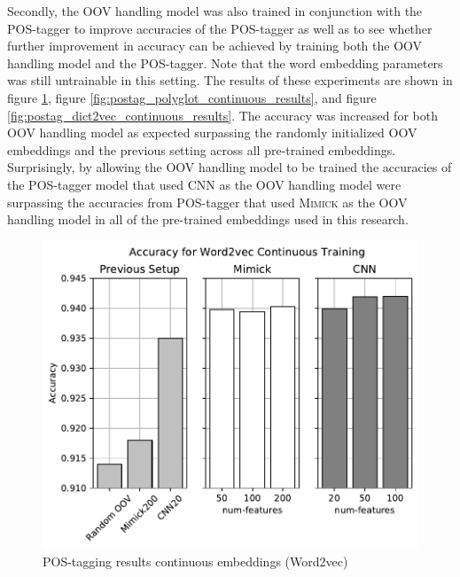       Secondly, the OOV handling model was also trained in conjunction
      with the POS-tagger to improve accuracies of the POS-tagger as
      well as to see whether further improvement in accuracy can
      be achieved by training both the OOV handling model and the
      POS-tagger. Note that the word embedding parameters was still
      untrainable in this setting. The results of these experiments
      are shown in figure
      \ref{fig:postag_word2vec_continuous_results}, figure
      \ref{fig:postag_polyglot_continuous_results}, and figure
      \ref{fig:postag_dict2vec_continuous_results}. The accuracy was
      increased for both OOV handling model as expected surpassing the
      randomly initialized OOV embeddings and the previous setting
      across all pre-trained embeddings. Surprisingly, by allowing the
      OOV handling model to be trained the accuracies of the
      POS-tagger model that used CNN as the OOV handling model were
      surpassing the accuracies from POS-tagger that used
      \textsc{Mimick} as the OOV handling model in all of the
      pre-trained embeddings used in this research.
      \begin{figure}[H]
        \centering
        \includegraphics[width=0.8\linewidth]{images/continuous_word2vec.pdf}
        \caption{POS-tagging results continuous embeddings (Word2vec)}
        \label{fig:postag_word2vec_continuous_results}
      \end{figure}
